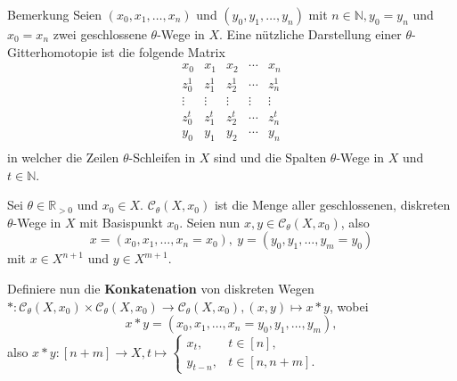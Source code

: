 \documentclass[12pt, aspectratio=169]{beamer}
\newcommand{\R}[0]{\mathbb{R}}
\newcommand{\N}[0]{\mathbb{N}}
\begin{document}
\begin{frame}
    \begin{block}{Bemerkung}
        Seien $(x_0, x_1, \ldots, x_n)$ und $(y_0, y_1, \ldots, y_n)$ mit $n \in \N, y_0 = y_n$ und $x_0 = x_n$ zwei geschlossene $\theta$-Wege in $X$. 
        Eine nützliche Darstellung einer $\theta$-Gitterhomotopie ist die folgende Matrix  
        \begin{equation*}
            \begin{matrix}
            x_0 & x_1 & x_2 & \cdots & x_n \\
            z_0^1 & z_1^1 & z_2^1 & \cdots & z_n^1 \\
            \vdots & \vdots & \vdots & \vdots & \vdots \\
            z_0^{t} & z_1^{t} & z_2^{t} & \cdots & z_n^{t} \\
            y_0 & y_1 & y_2 & \cdots & y_n \\
            \end{matrix}
        \end{equation*}
        in welcher die Zeilen $\theta$-Schleifen in $X$ sind und die Spalten $\theta$-Wege in $X$ und $t\in \N$.
    \end{block}
\end{frame}

\begin{frame}
    \begin{definition}
        Sei $\theta \in \R_{>0}$ und $x_0 \in X$. $\mathcal{C}_{\theta}(X, x_0)$ ist die Menge aller geschlossenen, diskreten $\theta$-Wege in $X$ mit Basispunkt $x_0$. 
        Seien nun $x, y \in \mathcal{C}_{\theta}(X, x_0)$, also    
        \begin{equation*}
            x = (x_0, x_1, \ldots, x_n = x_0), \: y = (y_0, y_1, \ldots, y_m = y_0)
        \end{equation*} mit $x \in X^{n+1}$ und $y \in X^{m+1}$.
        
        Definiere nun die \textbf{Konkatenation} von diskreten Wegen 
        $*\colon \mathcal{C}_{\theta}(X, x_0) \times \mathcal{C}_{\theta}(X, x_0) \to \mathcal{C}_{\theta}(X, x_0), (x, y) \mapsto x * y$, wobei
        \begin{equation*}
            x * y = (x_0, x_1, \ldots, x_n = y_0, y_1, \ldots, y_m),
        \end{equation*}
        also $x * y\colon [n+m] \to X, t \mapsto \begin{cases}
            x_t, &t \in [n], \\
            y_{t-n}, &t \in [n,n+m].
        \end{cases}$
    \end{definition}
\end{frame}
\end{document}
